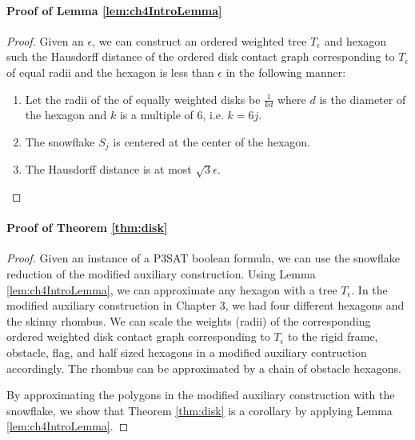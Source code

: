 \paragraph{Proof of Lemma \ref{lem:ch4IntroLemma}}
\begin{proof}
Given an $\epsilon$, we can construct an ordered weighted tree $T_\epsilon$ and hexagon such the Hausdorff distance of the ordered disk contact graph corresponding to $T_\epsilon$ of equal radii and the hexagon is less than $\epsilon$ in the following manner:
\begin{enumerate}
	\item Let the radii of the of equally weighted disks be $\frac{1}{kd}$ where $d$ is the diameter of the hexagon and $k$ is a multiple of 6, i.e. $k = 6 j$.  
	\item The snowflake $S_j$ is centered at the center of the hexagon.
	\item The Hausdorff distance is at most $\sqrt{3}\epsilon$.
\end{enumerate}	
\end{proof}

\paragraph{Proof of Theorem \ref{thm:disk}}

\begin{proof}
Given an instance of a P3SAT boolean formula, we can use the snowflake reduction of the modified auxiliary construction.  
Using Lemma \ref{lem:ch4IntroLemma}, we can approximate any hexagon with a tree $T_\epsilon$.  In the modified auxiliary construction in Chapter 3, we had four different hexagons and the skinny rhombus.  
We can scale the weights (radii) of the corresponding ordered weighted disk contact graph corresponding to $T_\epsilon$ to the rigid frame, obstacle, flag, and half sized hexagons in a modified auxiliary contruction accordingly.  
The rhombus can be approximated by a chain of obstacle hexagons.

By approximating the polygons in the modified auxiliary construction with the snowflake, we show that Theorem \ref{thm:disk} is a corollary by applying Lemma \ref{lem:ch4IntroLemma}.  
\end{proof}
